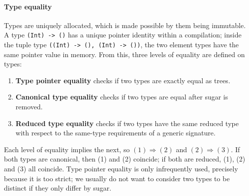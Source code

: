\documentclass[../generics]{subfiles}
\begin{document}
\paragraph{Type equality} Types are uniquely allocated, which is made possible by them being immutable. A type \texttt{(Int) -> ()} has a unique pointer identity within a compilation; inside the tuple type \texttt{((Int) -> (), (Int) -> ())}, the two element types have the same pointer value in memory. From this, three levels of equality are defined on types:
\begin{enumerate}
\item {}\textbf{Type pointer equality} checks if two types are exactly equal as trees.
\item {}\textbf{Canonical type equality} checks if two types are equal after sugar is removed.
\item {}\textbf{Reduced type equality} checks if two types have the same reduced type with respect to the same-type requirements of a generic signature.
\end{enumerate}
Each level of equality implies the next, so $(1)\Rightarrow(2)$ and $(2)\Rightarrow(3)$. If both types are canonical, then (1) and (2) coincide; if both are reduced, (1), (2) and (3) all coincide. Type pointer equality is only infrequently used, precisely because it is too strict; we usually do not want to consider two types to be distinct if they only differ by sugar.
\end{document}
